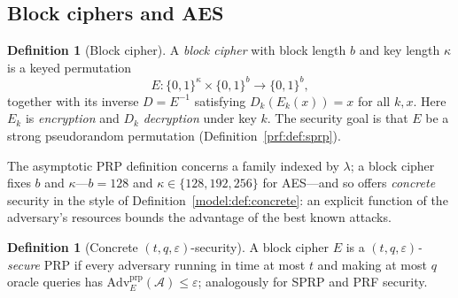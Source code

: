 \documentclass[11pt,a4paper]{article}
\theoremstyle{definition}
\newtheorem{definition}[theorem]{Definition}
\theoremstyle{remark}
\begin{document}
\subsection{Block ciphers and AES}\label{prf:subsec:blockcipher}

\begin{definition}[Block cipher]\label{prf:def:blockcipher}
A \emph{block cipher} with block length \(b\) and key length
\(\kappa\) is a keyed permutation
\[
E \colon \{0,1\}^{\kappa} \times \{0,1\}^{b}
  \longrightarrow \{0,1\}^{b},
\]
together with its inverse \(D = E^{-1}\) satisfying
\(D_{k}(E_{k}(x)) = x\) for all \(k, x\). Here \(E_{k}\) is
\emph{encryption} and \(D_{k}\) \emph{decryption} under key \(k\). The
security goal is that \(E\) be a strong pseudorandom permutation
(Definition~\ref{prf:def:sprp}).
\end{definition}

The asymptotic PRP definition concerns a family indexed by
\(\lambda\); a block cipher fixes \(b\) and \(\kappa\)---\(b = 128\)
and \(\kappa \in \{128, 192, 256\}\) for AES---and so offers
\emph{concrete} security in the style of
Definition~\ref{model:def:concrete}: an explicit function of the
adversary's resources bounds the advantage of the best known attacks.

\begin{definition}[Concrete \((t, q, \varepsilon)\)-security]
\label{prf:def:concrete}
A block cipher \(E\) is a \emph{\((t, q, \varepsilon)\)-secure} PRP if
every adversary running in time at most \(t\) and making at most \(q\)
oracle queries has
\(\mathrm{Adv}^{\mathrm{prp}}_{E}(\mathcal{A}) \le \varepsilon\);
analogously for SPRP and PRF security.
\end{definition}
\end{document}
